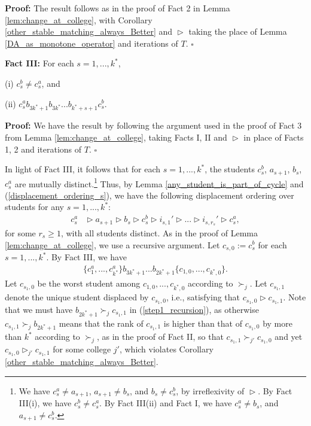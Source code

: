 \documentclass[12pt, fullpage]{amsart}
\theoremstyle{definition}
\theoremstyle{definition}
\theoremstyle{definition}
\begin{document}
\begin{bibunit}[econometrica]
\noindent\textbf{Proof:} The result follows as in the proof of Fact 2 in Lemma \ref{lem:change_at_college}, with Corollary \ref{other_stable_matching_always_Better} and $\vartriangleright$ taking the place of Lemma \ref{DA_as_monotone_operator} and iterations of $T$. $\square$ \medskip 

\noindent \textbf{Fact III:} For each $s=1,...,k^{*}$, 

(i) $c_{s}^{b}\ne c_{s}^{a}$, and 

(ii) $c_{s}^{a}b_{3k^{*}+1}b_{3k^{*}}...b_{k^{*}+s+1}c_{s}^{b}$.\medskip

\noindent \textbf{Proof: } We have the result by following the argument used in the proof of Fact 3 from Lemma \ref{lem:change_at_college}, taking Facts I,  II and $\vartriangleright$ in place of Facts 1, 2 and iterations of $T$. $\square$ \medskip

In light of Fact III, it follows that for each $s=1,...,k^{*}$, the students $c_{s}^{b}$, $a_{s+1}$, $b_{s}$, $c_{s}^{a}$ are mutually distinct.\footnote{We have $c_{s}^{a}\ne a_{s+1}$, $a_{s+1}\ne b_{s}$, and  $b_{s}\ne c_{s}^{b}$, by irreflexivity of $\vartriangleright$. By Fact III(i),  we have $c_{s}^{b}\ne c_{s}^{a}$. By Fact III(ii) and Fact I, we have $c_{s}^{a}\ne b_{s}$, and $a_{s+1}\ne c_{s}^{b}$.} Thus, by  Lemma \ref{any_student_is_part_of_cycle} and (\ref{displacement_ordering_s}), we have the following displacement ordering over students for any $s=1,...,k^{*}$:
\begin{align}\label{T_operator_analogue_2}
	c_{s}^{a}&\vartriangleright a_{s+1}\vartriangleright b_{s}\vartriangleright 	c_{s}^{b}\vartriangleright i_{s,1}'\vartriangleright...\vartriangleright i_{s,r_{s}}' \vartriangleright c_{s}^{a},
\end{align}
for some $r_{s}\geq 1$, with all students distinct. As in the proof of Lemma \ref{lem:change_at_college}, we use a recursive argument.  Let $c_{s,0}:=c_{s}^{b}$ for each $s=1,...,k^{*}$. By Fact III, we have 
\begin{align}\label{step1_recursion}
	\{c_{1}^{a},...,c_{k^{*}}^{a}\}b_{3k^{*}+1}...b_{2k^{*}+1}\{c_{1,0},...,c_{k^{*},0}\}.
\end{align}
Let $c_{s_1,0}$ be the worst student among $c_{1,0},...,c_{k^{*},0}$ according to $\succ_{j}$.  Let $c_{s_1,1}$ denote the unique student displaced by $c_{s_1,0}$, i.e., satisfying that $c_{s_1,0}\vartriangleright c_{s_1,1}$. Note that we must have $b_{2k^{*}+1}\succ_{j}c_{s_1,1}$ in (\ref{step1_recursion}), as otherwise $c_{s_1,1} \succ_j b_{2k^{*}+1}$ means that the rank of $c_{s_1,1}$ is higher than that of $c_{s_1,0}$ by more than $k^*$ according to $\succ_j$, as in the proof of Fact II, so that $c_{s_1,1} \succ_{j'} c_{s_1,0}$ and yet $c_{s_1,0}\vartriangleright_{j'} c_{s_1,1}$ for some college $j'$, which violates Corollary \ref{other_stable_matching_always_Better}.


\end{bibunit}
\end{document}
